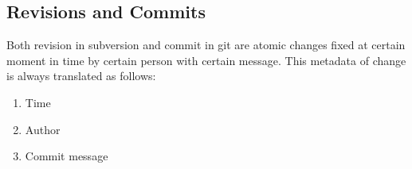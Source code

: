 \subsection{Revisions and Commits}

Both revision in subversion and commit in git are atomic changes fixed at certain moment in time by certain person with certain message. This metadata of change is always translated as follows:
\begin{enumerate}
\compactlist
\item Time
\item Author
\item Commit message
\end{enumerate}